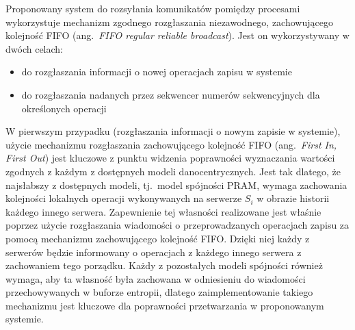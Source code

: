 Proponowany system do rozsyłania komunikatów pomiędzy procesami wykorzystuje mechanizm zgodnego
rozgłaszania niezawodnego, zachowującego kolejność FIFO (ang.\ \textit{FIFO regular reliable broadcast}). Jest on wykorzystywany w dwóch celach:

\begin{itemize}
    \item do rozgłaszania informacji o nowej operacjach zapisu w systemie
    \item do rozgłaszania nadanych przez sekwencer numerów sekwencyjnych dla określonych operacji
\end{itemize}

W pierwszym przypadku (rozgłaszania informacji o nowym zapisie w systemie), użycie mechanizmu
rozgłaszania zachowującego kolejność FIFO (ang.\ \textit{First In, First Out}) jest kluczowe z
punktu widzenia poprawności wyznaczania wartości zgodnych z każdym z dostępnych modeli
danocentrycznych. Jest tak dlatego, że najsłabszy z dostępnych modeli, tj.\ model spójności PRAM, wymaga zachowania kolejności lokalnych operacji wykonywanych na serwerze $ S_i $ w obrazie historii każdego innego serwera. Zapewnienie tej własności realizowane jest właśnie poprzez użycie rozgłaszania wiadomości o przeprowadzanych operacjach zapisu za pomocą mechanizmu zachowującego kolejność FIFO. Dzięki niej każdy z serwerów będzie informowany o operacjach z każdego innego serwera z zachowaniem tego porządku. Każdy z pozostałych modeli spójności również wymaga, aby ta własność była zachowana w odniesieniu do wiadomości przechowywanych w buforze entropii, dlatego zaimplementowanie takiego mechanizmu jest kluczowe dla poprawności przetwarzania w proponowanym systemie.

